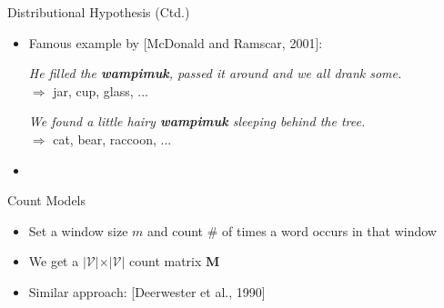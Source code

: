 \begin{frame}{Distributional Hypothesis (Ctd.)}{}
	\begin{itemize}
		\item Famous example by [McDonald and Ramscar, 2001]:
		\vspace*{2mm}
		\begin{center}
			\textit{He filled the \textbf{wampimuk}, passed it around and we all drank some.} \\
			$\Rightarrow$ jar, cup, glass, ...
		\end{center}
		\vspace*{2mm}
		\pause
		\begin{center}
			\textit{We found a little hairy \textbf{wampimuk} sleeping behind the tree.} \\
			$\Rightarrow$ cat, bear, raccoon, ...
		\end{center}
		\vspace*{2mm}
		\item {}
	\end{itemize}
\end{frame}


\begin{frame}{Count Models}{}
	\begin{itemize}
		\item Set a window size $m$ and count \# of times a word occurs in that window
		\item We get a $\vert \mathcal{V} \vert \times \vert \mathcal{V} \vert$ count matrix $\bm{M}$
		\item Similar approach:  [Deerwester et al., 1990]
	\end{itemize}
\end{frame}


